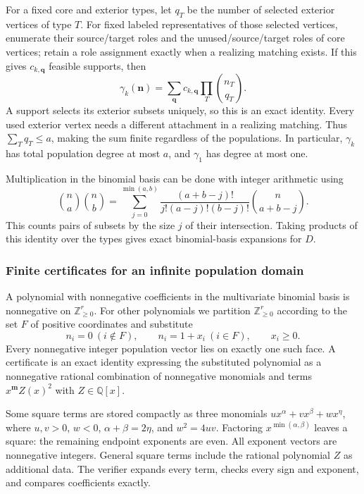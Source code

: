 \documentclass[11pt]{article}
\numberwithin{equation}{section}
\theoremstyle{definition}\newtheorem{definition}[theorem]{Definition}\newtheorem{remark}[theorem]{Remark}
\newcommand{\N}{\mathbb Z_{\ge0}}          %
\newcommand{\Q}{\mathbb Q}                 %
\begin{document}
For a fixed core and exterior types, let $q_T$ be the number of selected exterior vertices of type $T$. For fixed labeled representatives of those selected vertices, enumerate their source/target roles and the unused/source/target roles of core vertices; retain a role assignment exactly when a realizing matching exists. If this gives $c_{k,\boldsymbol q}$ feasible supports, then
\begin{equation}\label{pgr:u:d3:eq:binomialkernel}
 \gamma_k(\boldsymbol n)=
 \sum_{\boldsymbol q} c_{k,\boldsymbol q}
 \prod_T\binom{n_T}{q_T}.
\end{equation}
A support selects its exterior subsets uniquely, so this is an exact identity. Every used exterior vertex needs a different attachment in a realizing matching. Thus $\sum_Tq_T\le a$, making the sum finite regardless of the populations. In particular, $\gamma_k$ has total population degree at most $a$, and $\gamma_1$ has degree at most one.

Multiplication in the binomial basis can be done with integer arithmetic using
\begin{equation}\label{pgr:u:d3:eq:binprod}
 \binom na\binom nb=
 \sum_{j=0}^{\min(a,b)}
 \frac{(a+b-j)!}{j!(a-j)!(b-j)!}\binom n{a+b-j}.
\end{equation}
This counts pairs of subsets by the size $j$ of their intersection. Taking products of this identity over the types gives exact binomial-basis expansions for $D$.

\subsubsection{Finite certificates for an infinite population domain}

A polynomial with nonnegative coefficients in the multivariate binomial basis is nonnegative on $\N^r$. For other polynomials we partition $\N^r$ according to the set $F$ of positive coordinates and substitute
\begin{equation}\label{pgr:u:d3:eq:faces}
 n_i=0\ (i\notin F),\qquad n_i=1+x_i\ (i\in F),\qquad x_i\ge0.
\end{equation}
Every nonnegative integer population vector lies on exactly one such face. A certificate is an exact identity expressing the substituted polynomial as a nonnegative rational combination of nonnegative monomials and terms $x^{\boldsymbol m}Z(x)^2$ with $Z\in\Q[x]$.

Some square terms are stored compactly as three monomials $ux^\alpha+vx^\beta+wx^\eta$, where $u,v>0$, $w<0$, $\alpha+\beta=2\eta$, and $w^2=4uv$. Factoring $x^{\min(\alpha,\beta)}$ leaves a square: the remaining endpoint exponents are even. All exponent vectors are nonnegative integers. General square terms include the rational polynomial $Z$ as additional data. The verifier expands every term, checks every sign and exponent, and compares coefficients exactly.
\end{document}
